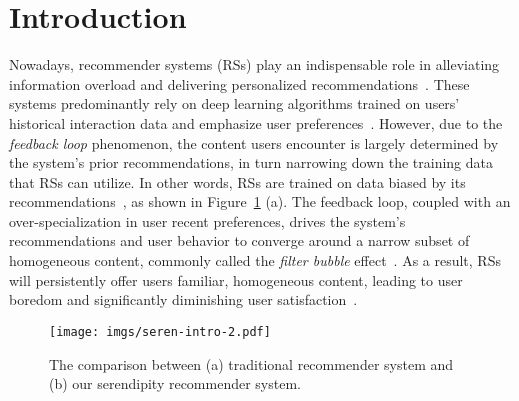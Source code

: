\vspace{-5pt}
\section{Introduction}





Nowadays, recommender systems (RSs) play an indispensable role in alleviating information overload and delivering personalized recommendations~\cite{fu2023deep,li2023breaking}. These systems predominantly rely on deep learning algorithms trained on users' historical interaction data and emphasize user preferences~\cite{zhou2018deep,xi2022multi,qin2020user}. However, due to the \textit{feedback loop} phenomenon, the content users encounter is largely determined by the system's prior recommendations, in turn narrowing down the training data that RSs can utilize. In other words, RSs are trained on data biased by its recommendations~\cite{li2023breaking,krauth2022breaking,mansoury2020feedback,chen2023bias}, as shown in Figure~\ref{fig:compare_intro} (a). The feedback loop, coupled with an over-specialization in user recent preferences, drives the system's recommendations and user behavior to converge around a narrow subset of homogeneous content, commonly called the \textit{filter bubble} effect~\cite{fu2023deep,aridor2020deconstructing,nguyen2014exploring}. As a result, RSs will persistently offer users familiar, homogeneous content, leading to user boredom and significantly diminishing user satisfaction~\cite{fu2023deep,niu2021luckyfind,niu2018adaptive}.

\begin{figure}
    \centering
    \vspace{-5pt}
    \texttt{[image: imgs/seren-intro-2.pdf]}
    \vspace{-20pt}
    \caption{The comparison between (a) traditional recommender system and (b) our serendipity recommender system.}
    \vspace{-15pt}
    \label{fig:compare_intro}
\end{figure}

